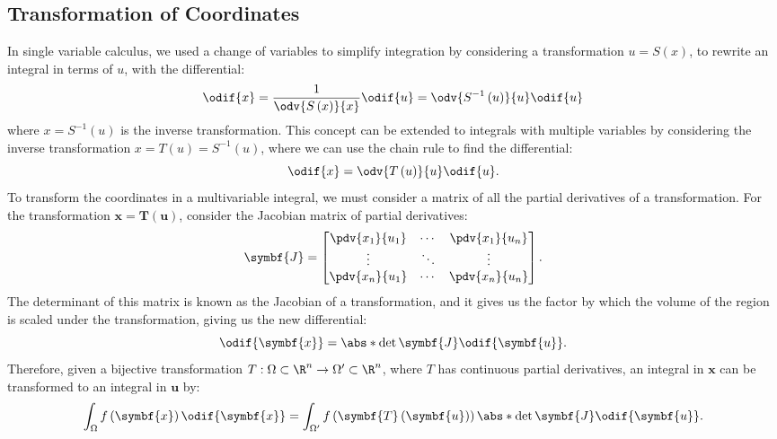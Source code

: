 \documentclass{article}
\begin{document}
\subsection{Transformation of Coordinates}
In single variable calculus, we used a change of variables to simplify
integration by considering a transformation \(u = S\left( x \right)\),
to rewrite an integral in terms of \(u\), with the differential:
\begin{equation*}
    \odif{x} = \frac{1}{\odv{S\left( x \right)}{x}} \odif{u} = \odv{S^{-1}\left( u \right)}{u} \odif{u}
\end{equation*}
where \(x = S^{-1}\left( u \right)\) is the inverse transformation. This
concept can be extended to integrals with multiple variables by
considering the inverse transformation
\(x = T\left( u \right) = S^{-1}\left( u \right)\), where we can use
the chain rule to find the differential:
\begin{equation*}
    \odif{x} = \odv{T\left( u \right)}{u} \odif{u}.
\end{equation*}
To transform the coordinates in a multivariable integral, we must consider
a matrix of all the partial derivatives of a transformation. For the
transformation \(\symbf{x} = \symbf{T}\left( \symbf{u} \right)\),
consider the Jacobian matrix of partial derivatives:
\begin{equation*}
    \symbf{J} =
    \begin{bmatrix}
        \displaystyle\pdv{x_1}{u_1} & \cdots & \displaystyle\pdv{x_1}{u_n} \\
        \vdots                      & \ddots & \vdots                      \\
        \displaystyle\pdv{x_n}{u_1} & \cdots & \displaystyle\pdv{x_n}{u_n}
    \end{bmatrix}
    .
\end{equation*}
The determinant of this matrix is known as the Jacobian of a transformation,
and it gives us the factor by which the volume of the region is scaled
under the transformation, giving us the new differential:
\begin{equation*}
    \odif{\symbf{x}} = \abs*{\det{\symbf{J}}} \odif{\symbf{u}}.
\end{equation*}
Therefore, given a bijective transformation \(T : \Omega \subset \R^n \to \Omega'\subset \R^n\),
where \(T\) has continuous partial derivatives, an integral in
\(\symbf{x}\) can be transformed to an integral in \(\symbf{u}\) by:
\begin{equation*}
    \int_\Omega f\left( \symbf{x} \right) \odif{\symbf{x}} = \int_{\Omega'} f\left( \symbf{T}\left( \symbf{u} \right) \right) \abs*{\det{\symbf{J}}} \odif{\symbf{u}}.
\end{equation*}
\end{document}
